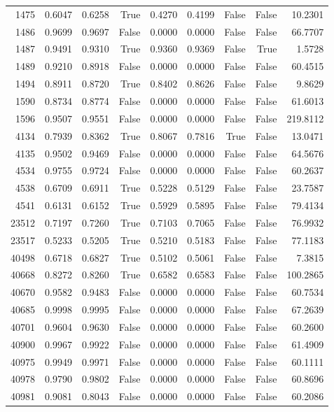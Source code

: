 \begin{longtable}{rrrrrrrrr}
1475 & 0.6047 & 0.6258 & True & 0.4270 & 0.4199 & False & False & 10.2301 \\
1486 & 0.9699 & 0.9697 & False & 0.0000 & 0.0000 & False & False & 66.7707 \\
1487 & 0.9491 & 0.9310 & True & 0.9360 & 0.9369 & False & True & 1.5728 \\
1489 & 0.9210 & 0.8918 & False & 0.0000 & 0.0000 & False & False & 60.4515 \\
1494 & 0.8911 & 0.8720 & True & 0.8402 & 0.8626 & False & False & 9.8629 \\
1590 & 0.8734 & 0.8774 & False & 0.0000 & 0.0000 & False & False & 61.6013 \\
1596 & 0.9507 & 0.9551 & False & 0.0000 & 0.0000 & False & False & 219.8112 \\
4134 & 0.7939 & 0.8362 & True & 0.8067 & 0.7816 & True & False & 13.0471 \\
4135 & 0.9502 & 0.9469 & False & 0.0000 & 0.0000 & False & False & 64.5676 \\
4534 & 0.9755 & 0.9724 & False & 0.0000 & 0.0000 & False & False & 60.2637 \\
4538 & 0.6709 & 0.6911 & True & 0.5228 & 0.5129 & False & False & 23.7587 \\
4541 & 0.6131 & 0.6152 & True & 0.5929 & 0.5895 & False & False & 79.4134 \\
23512 & 0.7197 & 0.7260 & True & 0.7103 & 0.7065 & False & False & 76.9932 \\
23517 & 0.5233 & 0.5205 & True & 0.5210 & 0.5183 & False & False & 77.1183 \\
40498 & 0.6718 & 0.6827 & True & 0.5102 & 0.5061 & False & False & 7.3815 \\
40668 & 0.8272 & 0.8260 & True & 0.6582 & 0.6583 & False & False & 100.2865 \\
40670 & 0.9582 & 0.9483 & False & 0.0000 & 0.0000 & False & False & 60.7534 \\
40685 & 0.9998 & 0.9995 & False & 0.0000 & 0.0000 & False & False & 67.2639 \\
40701 & 0.9604 & 0.9630 & False & 0.0000 & 0.0000 & False & False & 60.2600 \\
40900 & 0.9967 & 0.9922 & False & 0.0000 & 0.0000 & False & False & 61.4909 \\
40975 & 0.9949 & 0.9971 & False & 0.0000 & 0.0000 & False & False & 60.1111 \\
40978 & 0.9790 & 0.9802 & False & 0.0000 & 0.0000 & False & False & 60.8696 \\
40981 & 0.9081 & 0.8043 & False & 0.0000 & 0.0000 & False & False & 60.2086 \\

\end{longtable}
